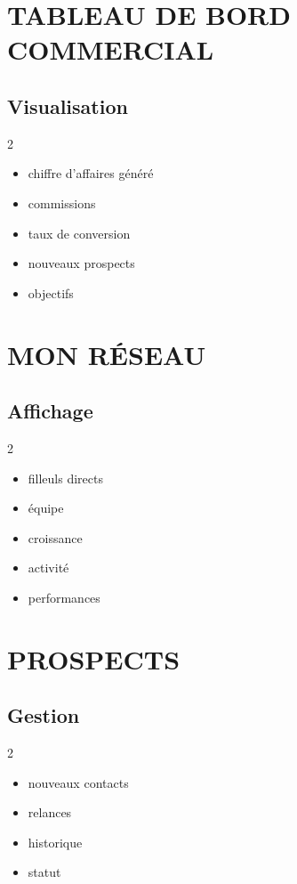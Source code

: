 \documentclass[12pt,a4paper,oneside]{book}
\begin{document}
\chapter{TABLEAU DE BORD COMMERCIAL}

\section{Visualisation}
\begin{multicols}{2}
\begin{itemize}
\item chiffre d'affaires généré
\item commissions
\item taux de conversion
\item nouveaux prospects
\item objectifs
\end{itemize}
\end{multicols}

\chapter{MON RÉSEAU}

\section{Affichage}
\begin{multicols}{2}
\begin{itemize}
\item filleuls directs
\item équipe
\item croissance
\item activité
\item performances
\end{itemize}
\end{multicols}

\chapter{PROSPECTS}

\section{Gestion}
\begin{multicols}{2}
\begin{itemize}
\item nouveaux contacts
\item relances
\item historique
\item statut
\end{itemize}
\end{multicols}
\end{document}
